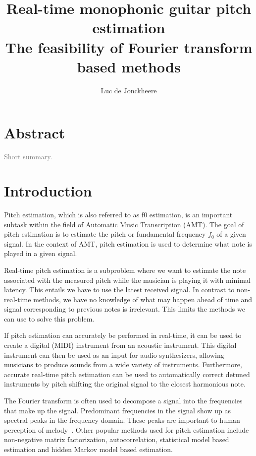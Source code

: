 \documentclass[10pt,twocolumn]{article}
\title{\textbf{Real-time monophonic guitar pitch estimation}\\The feasibility of Fourier transform based methods}
\author{Luc de Jonckheere}
\begin{document}

\maketitle


\section*{Abstract}
\textcolor{gray}{Short summary.}


\section{Introduction}
Pitch estimation, which is also referred to as f0 estimation, is an important subtask within the field of Automatic Music Transcription (AMT). The goal of pitch estimation is to estimate the pitch or fundamental frequency $f_0$ of a given signal. In the context of AMT, pitch estimation is used to determine what note is played in a given signal.

Real-time pitch estimation is a subproblem where we want to estimate the note associated with the measured pitch while the musician is playing it with minimal latency. This entails we have to use the latest received signal. In contrast to non-real-time methods, we have no knowledge of what may happen ahead of time and signal corresponding to previous notes is irrelevant. This limits the methods we can use to solve this problem.

If pitch estimation can accurately be performed in real-time, it can be used to create a digital (MIDI) instrument from an acoustic instrument. This digital instrument can then be used as an input for audio synthesizers, allowing musicians to produce sounds from a wide variety of instruments. Furthermore, accurate real-time pitch estimation can be used to automatically correct detuned instruments by pitch shifting the original signal to the closest harmonious note.

The Fourier transform is often used to decompose a signal into the frequencies that make up the signal. Predominant frequencies in the signal show up as spectral peaks in the frequency domain. These peaks are important to human perception of melody~\cite{hearing}. %
Other popular methods used for pitch estimation include non-negative matrix factorization, autocorrelation, statistical model based estimation and hidden Markov model based estimation.
\end{document}
